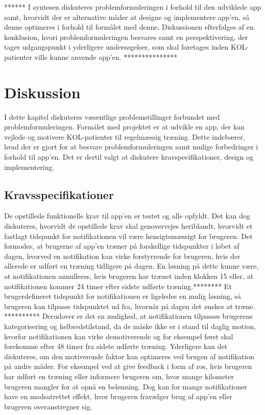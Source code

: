 ****** I syntesen diskuteres problemformuleringen i forhold til den udviklede app samt, hvorvidt der er alternative måder at designe og implementere app'en, så denne optimeres i forhold til formålet med denne. Diskussionen efterfølges af en konklusion, hvori problemformuleringen besvares samt en perspektivering, der tager udgangspunkt i yderligere undersøgelser, som skal foretages inden KOL-patienter ville kunne anvende app'en. ***************

\section{Diskussion}
I dette kapitel diskuteres væsentlige problemstillinger forbundet med problemformuleringen. Formålet med projektet er at udvikle en app, der kan vejlede og motivere KOL-patienter til regelmæssig træning. Dette indebærer, hvad der er gjort for at besvare problemformuleringen samt mulige forbedringer i forhold til app'en. Det er dertil valgt at diskutere kravspecifikationer, design og implementering.

\subsection{Kravsspecifikationer}
De opstillede funktionelle krav til app’en er testet og alle opfyldt. Det kan dog diskuteres, hvorvidt de opstillede krav skal genovervejes heriblandt, hvorvidt et fastlagt tidspunkt for notifikationen vil være hensigtsmæssigt for brugeren. Det formodes, at brugerne af app’en træner på forskellige tidspunkter i løbet af dagen, hvorved en notifikation kan virke forstyrrende for brugeren, hvis der allerede er udført en træning tidligere på dagen. En løsning på dette kunne være, at notifikationen annulleres, hvis brugeren har trænet inden klokken 15 eller, at notifikationen kommer 24 timer efter sidste udførte træning.******** Et brugerdefineret tidspunkt for notifikationen er ligeledes en mulig løsning, så brugeren kan tilpasse tidspunktet ud fra, hvornår på dagen det ønskes at træne. ********** Derudover er det en mulighed, at notifikationen tilpasses brugerens kategorisering og helbredstilstand, da de måske ikke er i stand til daglig motion, hvorfor notifikationen kan virke demotiverende og for eksempel først skal forekomme efter 48 timer fra sidste udførte træning. Yderligere kan det diskuteres, om den motiverende faktor kan optimeres ved brugen af notifikation på andre måder. For eksempel ved at give feedback i form af ros, hvis brugeren har udført en træning eller informere brugeren om, hvor mange kilometer brugeren mangler for at opnå en belønning. Dog kan for mange notifikationer have en modsatrettet effekt, hvor brugeren fravælger brug af app’en eller brugeren overanstregner sig. 

